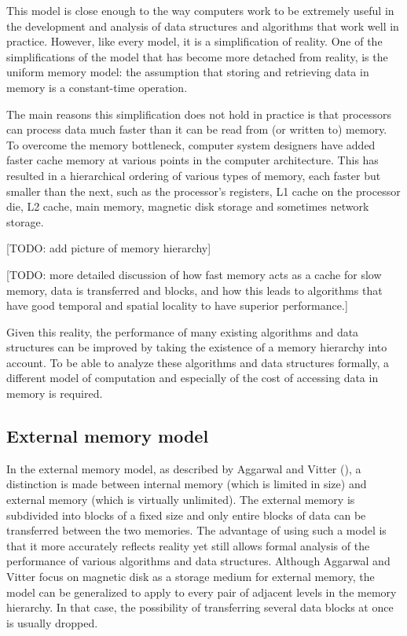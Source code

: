 \documentclass{acm_proc_article-sp}
\begin{document}
This model is close enough to the way computers work to be extremely useful in the development and analysis of data structures and algorithms that work well in practice. However, like every model, it is a simplification of reality. One of the simplifications of the model that has become more detached from reality, is the uniform memory model: the assumption that storing and retrieving data in memory is a constant-time operation.

The main reasons this simplification does not hold in practice is that processors can process data much faster than it can be read from (or written to) memory. To overcome the memory bottleneck, computer system designers have added faster cache memory at various points in the computer architecture. This has resulted in a hierarchical ordering of various types of memory, each faster but smaller than the next, such as the processor's registers, L1 cache on the processor die, L2 cache, main memory, magnetic disk storage and sometimes network storage.

[TODO: add picture of memory hierarchy]

[TODO: more detailed discussion of how fast memory acts as a cache for slow memory, data is transferred and blocks, and how this leads to algorithms that have good temporal and spatial locality to have superior performance.]

Given this reality, the performance of many existing algorithms and data structures can be improved by taking the existence of a memory hierarchy into account. To be able to analyze these algorithms and data structures formally, a different model of computation and especially of the cost of accessing data in memory is required.

\subsection{External memory model}
In the external memory model, as described by Aggarwal and Vitter (\cite{aggarwal1988ioc}), a distinction is made between internal memory (which is limited in size) and external memory (which is virtually unlimited). The external memory is subdivided into blocks of a fixed size and only entire blocks of data can be transferred between the two memories. The advantage of using such a model is that it more accurately reflects reality yet still allows formal analysis of the performance of various algorithms and data structures. Although Aggarwal and Vitter focus on magnetic disk as a storage medium for external memory, the model can be generalized to apply to every pair of adjacent levels in the memory hierarchy. In that case, the possibility of transferring several data blocks at once is usually dropped.
\end{document}
